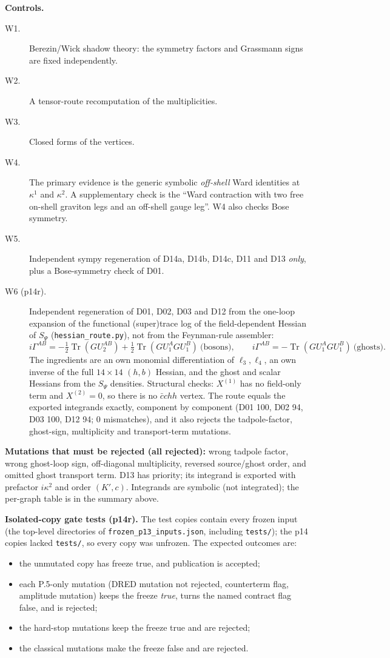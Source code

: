 \textbf{Controls.}
\begin{description}
\item[W1.] Berezin/Wick shadow theory: the symmetry factors and Grassmann signs are fixed independently.
\item[W2.] A tensor-route recomputation of the multiplicities.
\item[W3.] Closed forms of the vertices.
\item[W4.] The primary evidence is the generic symbolic \emph{off-shell} Ward identities at $\kappa^1$ and $\kappa^2$.
A supplementary check is the ``Ward contraction with two free on-shell graviton legs and an off-shell gauge leg''. W4
also checks Bose symmetry.
\item[W5.] Independent sympy regeneration of D14a, D14b, D14c, D11 and D13 \emph{only}, plus a Bose-symmetry check of D01.
\item[W6 (p14r).] Independent regeneration of D01, D02, D03 and D12 from the one-loop expansion of the functional
(super)trace log of the field-dependent Hessian of $S_\Psi$ (\texttt{hessian\_route.py}), not from the Feynman-rule
assembler:
\[i\Gamma^{AB}=-\tfrac12\operatorname{Tr}(GU_2^{AB})+\tfrac12\operatorname{Tr}(GU_1^AGU_1^B)\ \text{(bosons)},\qquad
i\Gamma^{AB}=-\operatorname{Tr}(GU_1^AGU_1^B)\ \text{(ghosts)}.\]
The ingredients are an own monomial differentiation of $\ell_3,\ell_4$, an own inverse of the full $14\times14$ $(h,b)$
Hessian, and the ghost and scalar Hessians from the $S_\Psi$ densities. Structural checks: $X^{(1)}$ has no field-only
term and $X^{(2)}=0$, so there is no $\bar cchh$ vertex. The route equals the exported integrands exactly, component by
component (D01 100, D02 94, D03 100, D12 94; 0 mismatches), and it also rejects the tadpole-factor, ghost-sign,
multiplicity and transport-term mutations.
\end{description}
\textbf{Mutations that must be rejected (all rejected):} wrong tadpole factor, wrong ghost-loop sign, off-diagonal
multiplicity, reversed source/ghost order, and omitted ghost transport term. D13 has priority; its integrand is exported
with prefactor $i\kappa^2$ and order $(K',c)$. Integrands are symbolic (not integrated); the per-graph table is in the
summary above.

\textbf{Isolated-copy gate tests (p14r).} The test copies contain every frozen input (the top-level directories of
\texttt{frozen\_p13\_inputs.json}, including \texttt{tests/}); the p14 copies lacked \texttt{tests/}, so every copy was
unfrozen. The expected outcomes are:
\begin{itemize}
\item the unmutated copy has freeze true, and publication is accepted;
\item each P.5-only mutation (DRED mutation not rejected, counterterm flag, amplitude mutation) keeps the freeze
\emph{true}, turns the named contract flag false, and is rejected;
\item the hard-stop mutations keep the freeze true and are rejected;
\item the classical mutations make the freeze false and are rejected.
\end{itemize}

